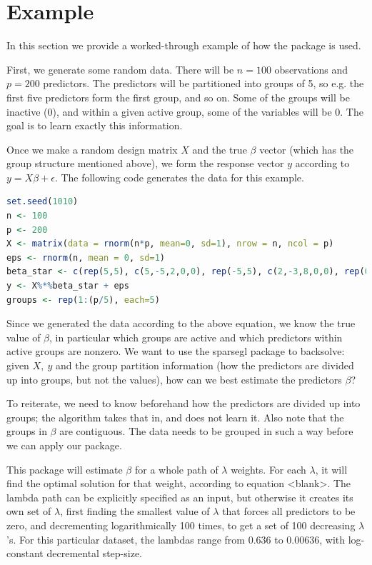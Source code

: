 \documentclass[12pt]{article}
\begin{document}
\section{Example}

In this section we provide a worked-through example of how the package is used. 

First, we generate some random data. There will be $n=100$ observations and $p=200$ predictors. The predictors will be partitioned into groups of 5, so e.g. the first five predictors form the first group, and so on. Some of the groups will be inactive ($0$), and within a given active group, some of the variables will be $0$. The goal is to learn exactly this information.

Once we make a random design matrix $X$ and the true $\beta$ vector (which has the group structure mentioned above), we form the response vector $y$ according to $y=X\beta + \epsilon$. The following code generates the data for this example.

\begin{lstlisting}[language=R]
set.seed(1010)
n <- 100
p <- 200
X <- matrix(data = rnorm(n*p, mean=0, sd=1), nrow = n, ncol = p)
eps <- rnorm(n, mean = 0, sd=1)
beta_star <- c(rep(5,5), c(5,-5,2,0,0), rep(-5,5), c(2,-3,8,0,0), rep(0,(p-20)))
y <- X%*%beta_star + eps
groups <- rep(1:(p/5), each=5)
\end{lstlisting}

Since we generated the data according to the above equation, we know the true value of $\beta$, in particular which groups are active and which predictors within active groups are nonzero. We want to use the sparsegl package to backsolve: given $X,\ y$ and the group partition information (how the predictors are divided up into groups, but not the values), how can we best estimate the predictors $\beta$?

To reiterate, we need to know beforehand how the predictors are divided up into groups; the algorithm takes that in, and does not learn it. Also note that the groups in $\beta$ are contiguous. The data needs to be grouped in such a way before we can apply our package.

This package will estimate $\beta$ for a whole path of $\lambda$ weights. For each $\lambda$, it will find the optimal solution for that weight, according to equation <blank>. The lambda path can be explicitly specified as an input, but otherwise it creates its own set of $\lambda$, first finding the smallest value of $\lambda$ that forces all predictors to be zero, and decrementing logarithmically 100 times, to get a set of 100 decreasing $\lambda$'s. For this particular dataset, the lambdas range from $0.636$ to $0.00636$, with log-constant decremental step-size.
\end{document}
